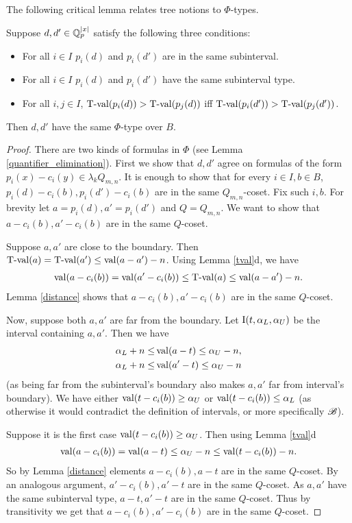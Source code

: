 The following critical lemma relates tree notions to $\Phi$-types.
\begin{Lemma} \label{main_lemma}
  Suppose $d, d' \in \mathbb{Q}_p^{|x|}$ satisfy the following three conditions:
  \begin{itemize}
  \item For all $i \in I$ $p_i(d)$ and $p_i(d')$ are in the same subinterval.
  \item For all $i \in I$ $p_i(d)$ and $p_i(d')$ have the same subinterval type.
  \item For all $i,j \in I$, $\operatorname{T-val}(p_i(d)) > \operatorname{T-val}(p_j(d))$ iff $\operatorname{T-val}(p_i(d')) > \operatorname{T-val}(p_j(d'))$.
  \end{itemize}
  Then $d, d'$ have the same $\Phi$-type over $B$.
\end{Lemma}
\begin{proof}
  There are two kinds of formulas in $\Phi$
  (see Lemma \ref{quantifier_elimination}).
  First we show that $d, d'$ agree on formulas of the form $p_i(x) - c_i(y) \in \lambda_k Q_{m,n}$.
  It is enough to show that for every $i \in I, b \in B$, $p_i(d) - c_i(b), p_i(d') - c_i(b)$ are in the same $Q_{m,n}$-coset.
  Fix such $i, b$.
  For brevity let $a = p_i(d), a' = p_i(d')$ and $Q = Q_{m,n}$.
  We want to show that $a - c_i(b), a' - c_i(b)$ are in the same $Q$-coset.
  
  Suppose $a, a'$ are close to the boundary.
  Then $\operatorname{T-val}(a) = \operatorname{T-val}(a') \leq \operatorname{val}(a - a') - n$.
  Using Lemma \ref{tval}d, we have
  \begin{align*}
    \operatorname{val}(a - c_i(b)) = \operatorname{val}(a' - c_i(b)) \leq \operatorname{T-val}(a) \leq \operatorname{val}(a - a') - n.
  \end{align*}
  Lemma \ref{distance} shows that $a - c_i(b), a' - c_i(b)$ are in the same $Q$-coset.
  
  Now, suppose both $a, a'$ are far from the boundary.
  Let $\operatorname{I}(t, \alpha_L, \alpha_U)$ be the interval containing $a, a'$.
  Then we have 
  \begin{align*}
    \alpha_L + n \leq &\operatorname{val} (a - t) \leq \alpha_U - n, \\
    \alpha_L + n \leq &\operatorname{val} (a' - t) \leq \alpha_U - n
  \end{align*}
  (as being far from the subinterval's boundary also makes $a,a'$ far from interval's boundary).
  We have either $\operatorname{val}(t - c_i(b)) \geq \alpha_U$ or $\operatorname{val}(t - c_i(b)) \leq \alpha_L$ (as otherwise it would contradict the definition of intervals, or more specifically $\mathscr B$).
  
  Suppose it is the first case $\operatorname{val}(t - c_i(b)) \geq \alpha_U$.
  Then using Lemma \ref{tval}d
  \begin{align*}
    \operatorname{val}(a - c_i(b)) = \operatorname{val}(a - t) \leq \alpha_U - n \leq \operatorname{val}(t - c_i(b)) - n.
  \end{align*}
  So by Lemma \ref{distance} elements $a - c_i(b), a - t$ are in the same $Q$-coset.
  By an analogous argument, $a' - c_i(b), a' - t$ are in the same $Q$-coset.
  As $a, a'$ have the same subinterval type, $a - t, a' - t$ are in the same $Q$-coset.
  Thus by transitivity we get that $a - c_i(b), a' - c_i(b)$ are in the same $Q$-coset.
  

\end{proof}
